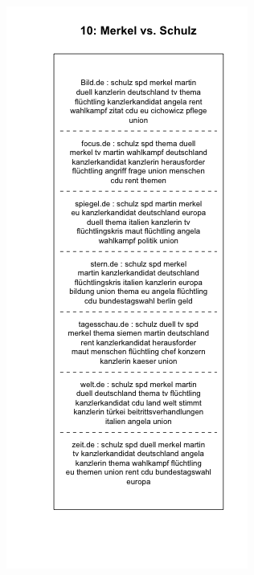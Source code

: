 \documentclass[12pt,a4paper,notitlepage]{article}
\begin{document}
\begin{figure}[H]
\begin{center}
\begin{subfigure}[normla]{0.49\textwidth}
		\end{subfigure}
		\begin{subfigure}[normla]{0.49\textwidth}
			\includegraphics[width=\textwidth]{../figs/plotquote10.png}
		\end{subfigure}
	\end{center}
\end{figure}
\end{document}
